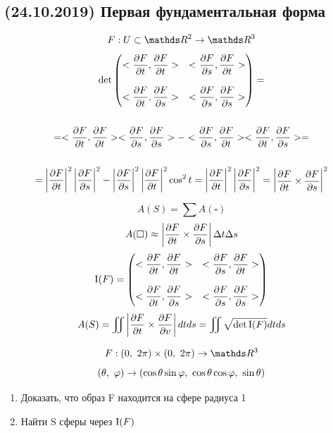 \documentclass[12pt, fleqn]{article}
\begin{document}
\newpage
\subsection{(24.10.2019) Первая фундаментальная форма}
\begin{Example}
  \[F: U \subset \R^2 \ra \R^3\]
  \begin{multline*}
    $$\det \begin{pmatrix}
      <\dfrac{\d F}{\d t}, \dfrac{\d F}{\d t}> & <\dfrac{\d F}{\d s}, \dfrac{\d F}{\d t}>\\
      \\
      <\dfrac{\d F}{\d t}, \dfrac{\d F}{\d s}> & <\dfrac{\d F}{\d s}, \dfrac{\d F}{\d s}>
    \end{pmatrix} = \\ \\
      = <\frac{\d F}{\d t}, \frac{\d F}{\d t}> <\frac{\d F}{\d s}, \frac{\d F}{\d s}> - <\frac{\d F}{\d s}, \frac{\d F}{\d t}> <\frac{\d F}{\d t}, \dfrac{\d F}{\d s}> =\\ \\
     =\abs{\dfrac{\d F}{\d t}}^2 \abs{\dfrac{\d F}{\d s}}^2 - \abs{\dfrac{\d F}{\d s}}^2 \abs{\dfrac{\d F}{\d t}}^2 \cos^2 t = \abs{\dfrac{\d F}{\d t}}^2 \abs{\dfrac{\d F}{\d s}}^2
    =
    \begin{vmatrix}
      \dfrac{\d F}{\d t} \times \dfrac{\d F}{\d s}
    \end{vmatrix}^2$$
  \end{multline*}
\end{Example}

\begin{Remark}
  \[A(S)=\sum A(\square)\]
  \[A(\square) \approx \left|\dfrac{\partial F}{\partial t} \times \dfrac{\partial F}{\partial s}\right| \Delta t \Delta s\]
  \[\RNumb{1}(F)= \begin{pmatrix}
    <\dfrac{\d F}{\d t}, \dfrac{\d F}{\d t}> & <\dfrac{\d F}{\d s}, \dfrac{\d F}{\d t}>\\
    \\
    <\dfrac{\d F}{\d t}, \dfrac{\d F}{\d s}> & <\dfrac{\d F}{\d s}, \dfrac{\d F}{\d s}>
  \end{pmatrix}\]
  \[A(S)= \iint \abs{\dfrac{\d F}{\d t} \times \dfrac{\d F}{\d v}} dt ds = \iint \sqrt{\det \RNumb{1}(F)} dt ds\]
\end{Remark}

\begin{Example}
  \[F: (0,\ 2\pi) \times (0,\ 2\pi) \ra \R^3\]
  \[(\theta,\ \varphi) \rightarrow (\cos \theta \sin \varphi,\ \cos \theta \cos \varphi,\ \sin \theta)\]
  \begin{enumerate}
    \item Доказать, что образ F находится на сфере радиуса 1
    \item Найти S сферы через $\RNumb{1}(F)$
  \end{enumerate}
\end{Example}
\end{document}
